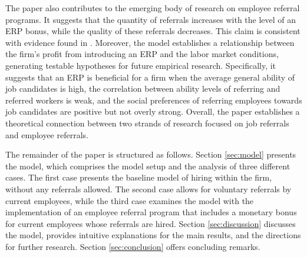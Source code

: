 \documentclass[12pt]{article}
\begin{document}
The paper also contributes to the emerging body of research on employee referral programs. It suggests that the quantity of referrals increases with the level of an ERP bonus, while the quality of these referrals decreases. This claim is consistent with evidence found in \cite{friebel2023employee}. Moreover, the model establishes a relationship between the firm's profit from introducing an ERP and the labor market conditions, generating testable hypotheses for future empirical research. Specifically, it suggests that an ERP is beneficial for a firm when the average general ability of job candidates is high, the correlation between ability levels of referring and referred workers is weak, and the social preferences of referring employees towards job candidates are positive but not overly strong. Overall, the paper establishes a theoretical connection between two strands of research focused on job referrals and employee referrals.

The remainder of the paper is structured as follows. Section \ref{sec:model} presents the model, which comprises the model setup and the analysis of three different cases. The first case presents the baseline model of hiring within the firm, without any referrals allowed. The second case allows for voluntary referrals by current employees, while the third case examines the model with the implementation of an employee referral program that includes a monetary bonus for current employees whose referrals are hired. Section \ref{sec:discussion} discusses the model, provides intuitive explanations for the main results, and the directions for further research. Section \ref{sec:conclusion} offers concluding remarks.
\end{document}
